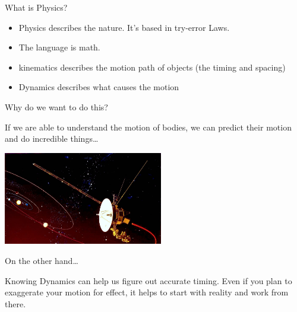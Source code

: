\documentclass[]{beamer}
\begin{document}
  \begin{frame}
  What is Physics?
  
  \pause
  \vspace{3mm}
  
  \begin{itemize}
  \item Physics describes the nature. It's based in try-error Laws.
  \pause
  \item The language is math.
  \pause
  \item kinematics describes the motion path of objects (the timing and spacing)
  \pause
  \item Dynamics describes what causes the motion 
  \end{itemize}
  

   \end{frame}

     \begin{frame}
Why do we want to do this? 

\pause
\vspace{3mm}

If we are able to understand the motion of bodies, we can predict their motion and do incredible things\dots

\pause

\vspace{3mm}


\begin{center}
   \includegraphics[height=1.6in]{images/voyager.jpg}
 \end{center}

    

     \end{frame}
  



  \begin{frame}
On the other hand\dots
 
 \pause
 \vspace{3mm}
 
 Knowing Dynamics can help us figure out accurate timing. Even if you plan to exaggerate your motion for 
 effect, it helps to start with reality and work from there.
  \end{frame}
\end{document}
